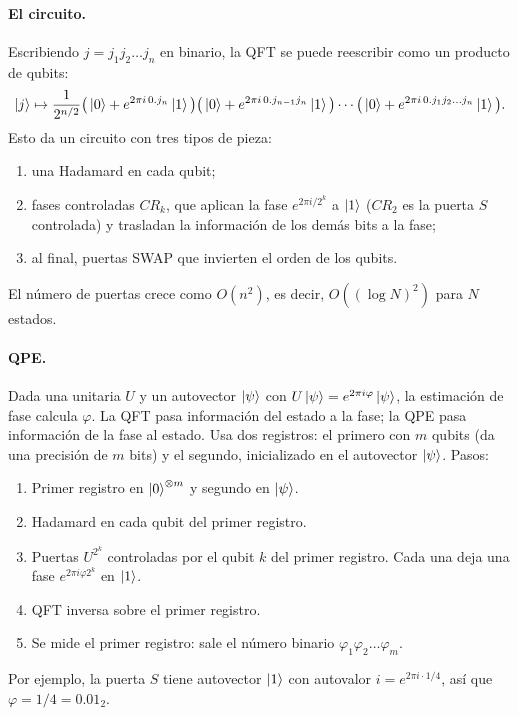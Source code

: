 \paragraph{El circuito.} Escribiendo $j=j_1j_2\ldots j_n$ en binario, la QFT se
puede reescribir como un producto de qubits:
\begin{equation}
  \left|j\right\rangle\mapsto\frac1{2^{n/2}}\big(\left|0\right\rangle+e^{2\pi i\,0.j_n}\left|1\right\rangle\big)
  \big(\left|0\right\rangle+e^{2\pi i\,0.j_{n-1}j_n}\left|1\right\rangle\big)\cdots
  \big(\left|0\right\rangle+e^{2\pi i\,0.j_1j_2\ldots j_n}\left|1\right\rangle\big).
\end{equation}
Esto da un circuito con tres tipos de pieza:
\begin{enumerate}
  \item una Hadamard en cada qubit;
  \item fases controladas $CR_k$, que aplican la fase $e^{2\pi i/2^k}$ a $\left|1\right\rangle$
    ($CR_2$ es la puerta $S$ controlada) y trasladan la información de los
    demás bits a la fase;
  \item al final, puertas SWAP que invierten el orden de los qubits.
\end{enumerate}
El número de puertas crece como $O(n^2)$, es decir, $O((\log N)^2)$ para $N$
estados.

\paragraph{QPE.} Dada una unitaria $U$ y un autovector $\left|\psi\right\rangle$ con
$U\left|\psi\right\rangle=e^{2\pi i\varphi}\left|\psi\right\rangle$, la estimación de fase calcula $\varphi$.
La QFT pasa información del estado a la fase; la QPE pasa información de la
fase al estado. Usa dos registros: el primero con $m$ qubits (da una precisión de
$m$ bits) y el segundo, inicializado en el autovector $\left|\psi\right\rangle$. Pasos:
\begin{enumerate}
  \item Primer registro en $\left|0\right\rangle^{\otimes m}$ y segundo en $\left|\psi\right\rangle$.
  \item Hadamard en cada qubit del primer registro.
  \item Puertas $U^{2^k}$ controladas por el qubit $k$ del primer registro.
    Cada una deja una fase $e^{2\pi i\varphi2^k}$ en $\left|1\right\rangle$.
  \item QFT inversa sobre el primer registro.
  \item Se mide el primer registro: sale el número binario $\varphi_1\varphi_2\ldots\varphi_m$.
\end{enumerate}
Por ejemplo, la puerta $S$ tiene autovector $\left|1\right\rangle$ con autovalor
$i=e^{2\pi i\cdot1/4}$, así que $\varphi=1/4=0.01_2$.

